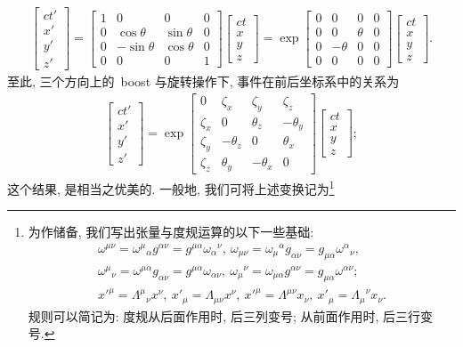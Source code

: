 \begin{align}
\left[
\begin{array}{l}
ct'\\x'\\y'\\z'
\end{array}
\right]=
\left[
\begin{array}{cccc}
1&0&0&0\\
0&\cos\theta&\sin\theta&0\\
0&-\sin\theta&\cos\theta&0\\
0&0&0&1
\end{array}
\right]
\left[
\begin{array}{l}
ct\\x\\y\\z
\end{array}
\right]
=\exp\left[
\begin{array}{cccc}
0&0&0&0\\
0&0&\theta&0\\
0&-\theta&0&0\\
0&0&0&0
\end{array}
\right]
\left[
\begin{array}{l}
ct\\x\\y\\z
\end{array}
\right].
\end{align}
至此, 三个方向上的~boost 与旋转操作下, 事件在前后坐标系中的关系为
\begin{align}
\left[
\begin{array}{l}
ct'\\x'\\y'\\z'
\end{array}
\right]
=\exp\left[
\begin{array}{cccc}
0&\zeta_x&\zeta_y&\zeta_z\\
\zeta_x&0&\theta_z&-\theta_y\\
\zeta_y&-\theta_z&0&\theta_x\\
\zeta_z&\theta_y&-\theta_x&0
\end{array}
\right]
\left[
\begin{array}{l}
ct\\x\\y\\z
\end{array}
\right];
\end{align}
这个结果, 是相当之优美的. 一般地, 我们可将上述变换记为\footnote{
为作储备, 我们写出张量与度规运算的以下一些基础:
\begin{gather}
\omega^{\mu\nu}={\omega^\mu}_\alpha g^{\alpha\nu}=g^{\mu\alpha}{\omega_\alpha}^\nu,~\omega_{\mu\nu}={\omega_\mu}^\alpha g_{\alpha\nu}=g_{\mu\alpha}{\omega^\alpha}_\nu,\\
{\omega^\mu}_\nu=\omega^{\mu\alpha}g_{\alpha\nu}=g^{\mu\alpha}\omega_{\alpha\nu},~{\omega_\mu}^\nu=\omega_{\mu\alpha}g^{\alpha\nu}
=g_{\mu\alpha}\omega^{\alpha\nu};\\
x'^\mu={\Lambda^\mu}_\nu x^\nu,~x'_\mu=\Lambda_{\mu\nu}x^\nu,~x'^\mu=\Lambda^{\mu\nu}x_\nu,~x'_\mu={\Lambda_\mu}^\nu x_\nu.
\end{gather}
规则可以简记为: 度规从后面作用时, 后三列变号; 从前面作用时, 后三行变号.}
